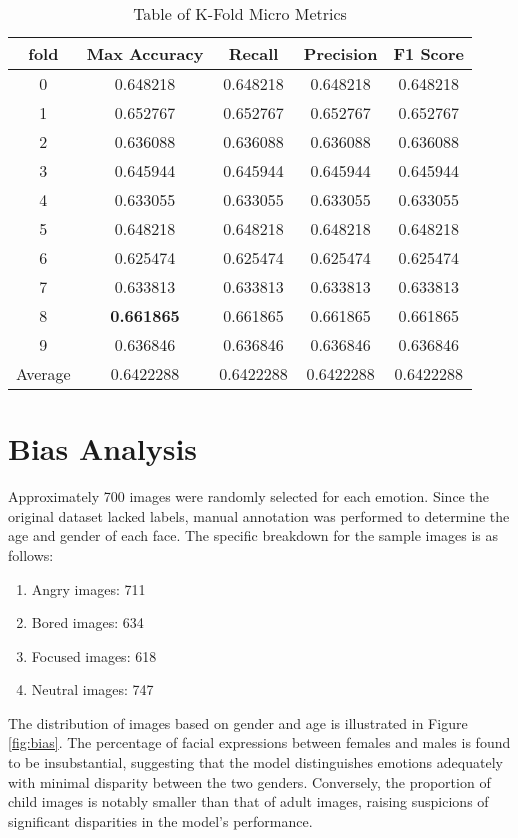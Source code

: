 \documentclass[]{report}
\begin{document}
\begin{table}[]
	\centering
	\caption{Table of K-Fold Micro Metrics}
	\begin{tabular}{|c|c|c|c|c|}
		\hline
		\textbf{fold} & \textbf{Max Accuracy} & \textbf{Recall} & \textbf{Precision} & \textbf{F1 Score} \\ \hline
		0       & 0.648218  & 0.648218  & 0.648218  & 0.648218  \\ \hline
		1       & 0.652767  & 0.652767  & 0.652767  & 0.652767  \\ \hline
		2       & 0.636088  & 0.636088  & 0.636088  & 0.636088  \\ \hline
		3       & 0.645944  & 0.645944  & 0.645944  & 0.645944  \\ \hline
		4       & 0.633055  & 0.633055  & 0.633055  & 0.633055  \\ \hline
		5       & 0.648218  & 0.648218  & 0.648218  & 0.648218  \\ \hline
		6       & 0.625474  & 0.625474  & 0.625474  & 0.625474  \\ \hline
		7       & 0.633813  & 0.633813  & 0.633813  & 0.633813  \\ \hline
		8       & \textbf{0.661865}  & 0.661865  & 0.661865  & 0.661865  \\ \hline
		9       & 0.636846  & 0.636846  & 0.636846  & 0.636846  \\ \hline
		Average & 0.6422288 & 0.6422288 & 0.6422288 & 0.6422288 \\ \hline
	\end{tabular}
\end{table}

\section{Bias Analysis}

Approximately 700 images were randomly selected for each emotion. Since the original dataset lacked labels, manual annotation was performed to determine the age and gender of each face. The specific breakdown for the sample images is as follows:
\begin{enumerate}
	\item Angry images:  711
	\item Bored images: 634
	\item Focused images: 618
	\item Neutral images: 747
\end{enumerate}

The distribution of images based on gender and age is illustrated in Figure \ref{fig:bias}. The percentage of facial expressions between females and males is found to be insubstantial, suggesting that the model distinguishes emotions adequately with minimal disparity between the two genders. Conversely, the proportion of child images is notably smaller than that of adult images, raising suspicions of significant disparities in the model's performance.
\end{document}
